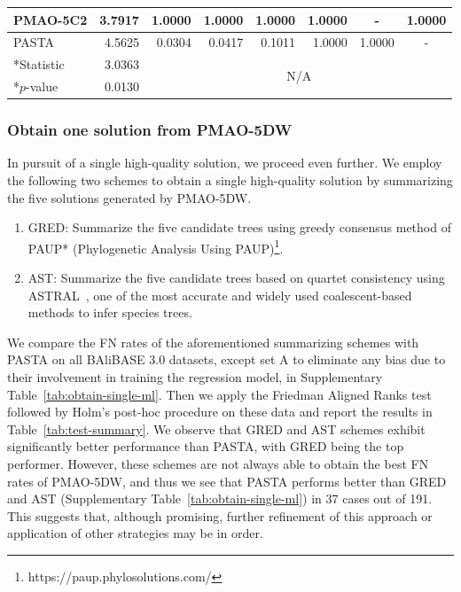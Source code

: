 \documentclass[a4paper,fleqn, review]{cas-dc}
\begin{document}
\begin{table}[pos=!htbp, align=\centering, width=17cm]
\begin{tabular}{|l|r||cccccc|}
		\hline
		 PMAO-5C2 & 3.7917 & \multicolumn{1}{r|}{1.0000} & \multicolumn{1}{r|}{1.0000} & \multicolumn{1}{r|}{1.0000} & \multicolumn{1}{r|}{1.0000} & \multicolumn{1}{c|}{-} & \multicolumn{1}{r|}{1.0000} \\
		\hline
		PASTA & 4.5625 & \multicolumn{1}{r|}{\cellcolor[rgb]{ 0,  .69,  .314}0.0304} & \multicolumn{1}{r|}{\cellcolor[rgb]{ 0,  .69,  .314}0.0417} & \multicolumn{1}{r|}{0.1011} & \multicolumn{1}{r|}{1.0000} & \multicolumn{1}{r|}{1.0000} & - \\
		\hline \hline
		*Statistic &    3.0363   & \multicolumn{6}{c|}{\multirow{2}[4]{*}{N/A}} \\
		\cline{1-2}    *$p$-value &  0.0130     & \multicolumn{6}{c|}{} \\
		\hline
	\end{tabular}%
	\label{tab:test-ml-weights}%
\end{table}%



\subsubsection{Obtain one solution from PMAO-5DW}
In pursuit of a single high-quality solution, we proceed even further. We employ the following two schemes to obtain a single high-quality solution by summarizing the five solutions generated by PMAO-5DW.
\begin{enumerate}
\item GRED: Summarize the five candidate trees using greedy consensus method of PAUP* (Phylogenetic Analysis Using PAUP)\footnote{https://paup.phylosolutions.com/}.
	\item AST: Summarize the five candidate trees based on quartet consistency using ASTRAL~\cite{zhang2018astral}, one of the most accurate and widely used coalescent-based methods to infer species trees.
\end{enumerate}
We compare the FN rates of the aforementioned summarizing schemes with PASTA on all BAliBASE 3.0 datasets, except set A to eliminate any bias due to their involvement in training the regression model, in Supplementary Table~\ref{tab:obtain-single-ml}. Then we apply the Friedman Aligned Ranks test followed by Holm's post-hoc procedure on these data and report the results in Table~\ref{tab:test-summary}. We observe that GRED and AST schemes exhibit significantly better performance than PASTA, with GRED being the top performer. However, these schemes are not always able to obtain the best FN rates of PMAO-5DW, and thus we see that PASTA performs better than GRED and AST (Supplementary Table~\ref{tab:obtain-single-ml}) in 37 cases out of 191. This suggests that, although promising, further refinement of this approach or application of other strategies may be in order.
\end{document}
